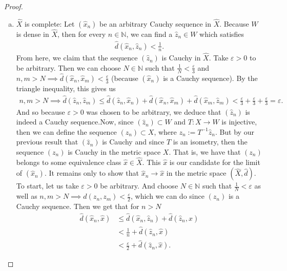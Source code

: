 \documentclass[11pt]{article}
\theoremstyle{mystyle}
\newcommand{\0}{\mathbf{0}}
\begin{document}
\begin{proof}
\begin{enumerate}[(a)]
\item $\hat{X}$ is complete:\newline
Let $(\hat{x}_n)$ be an arbitrary Cauchy sequence in $\hat{X}$. Because $W$ is dense in $\hat{X}$, then for every $n \in \mathbb{N}$, we can find a $\hat{z}_n \in W$ which satisfies
\begin{align*}
    \hat{d}(\hat{x}_n, \hat{z}_n) < \frac{1}{n}.
\end{align*}
From here, we claim that the sequence $(\hat{z}_n)$ is Cauchy in $\hat{X}$. Take $\varepsilon > 0$ to be arbitrary. Then we can choose $N \in \mathbb{N}$ such that $\frac{1}{N} < \frac{\varepsilon}{3}$ and $n, m > N \implies \hat{d}(\hat{x}_n, \hat{x}_m) < \frac{\varepsilon}{3}$ (because $(\hat{x}_n)$ is a Cauchy sequence). By the triangle inequality, this gives us 
\begin{align*}
    n, m > N \implies \hat{d}(\hat{z}_n, \hat{z}_m) \leq \hat{d}(\hat{z}_n, \hat{x}_n) + \hat{d}(\hat{x}_n, \hat{x}_m) + \hat{d}(\hat{x}_m, \hat{z}_m) < \frac{\varepsilon}{3} + \frac{\varepsilon}{3} + \frac{\varepsilon}{3} = \varepsilon.
\end{align*}
And so because $\varepsilon > 0$ was chosen to be arbitrary, we deduce that $(\hat{z}_n)$ is indeed a Cauchy sequence.\newline Now, since $(\hat{z}_n) \subset W$ and $T: X \longrightarrow W$ is injective, then we can define the sequence $(z_n) \subset X$, where $z_n := T^{-1}\hat{z}_n$. But by our previous result that $(\hat{z}_n)$ is Cauchy and since $T$ is an isometry, then the sequence $(z_n)$ is Cauchy in the metric space $X$. That is, we have that $(z_n)$ belongs to some equivalence class $\hat{x} \in \hat{X}$. This $\hat{x}$ is our candidate for the limit of $(\hat{x}_n)$.\newline
It remains only to show that $\hat{x}_n \longrightarrow \hat{x}$ in the metric space $(\hat{X}, \hat{d})$. To start, let us take $\varepsilon > 0$ be arbitrary. And choose $N \in \mathbb{N}$ such that $\frac{1}{N} < \varepsilon$ as well as $n, m > N \implies d(z_n, z_m) < \frac{\varepsilon}{2}$, which we can do since $(z_n)$ is a Cauchy sequence. Then we get that for $n > N$
\begin{align*}
    \hat{d}(\hat{x}_n, \hat{x}) &\leq \hat{d}(\hat{x}_n, \hat{z}_n) + \hat{d}(\hat{z}_n, \hat{x})\\
    &< \frac{1}{n} + \hat{d}(\hat{z}_n, \hat{x})\\
    &< \frac{\varepsilon}{2} + \hat{d}(\hat{z}_n, \hat{x}).
\end{align*}

\end{enumerate}
\end{proof}
\end{document}
